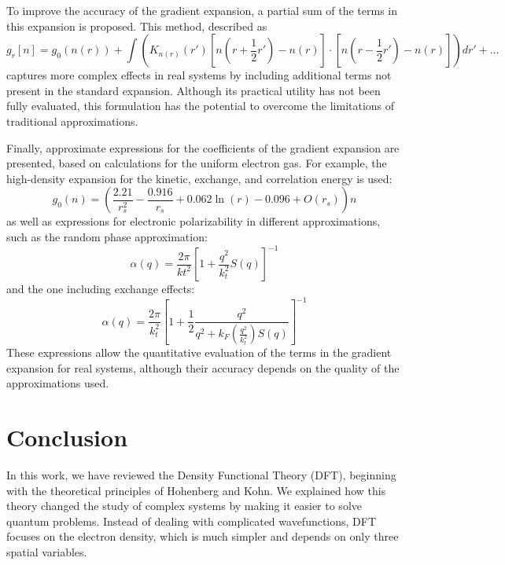 \documentclass[%
 preprint, linenumbers,
 amsmath,amssymb,
 aps, physrev,
]{revtex4-2}
\begin{document}
To improve the accuracy of the gradient expansion, a partial sum of the terms in this expansion is proposed. This method, described as
\begin{equation}
g_r[n] = g_0(n(r)) + \int \left( K_{n(r)}(r') \left[ n\left(r + \frac{1}{2} r'\right) - n(r) \right] \cdot \left[ n\left(r - \frac{1}{2} r'\right) - n(r) \right] \right) dr' + \ldots
\end{equation}
captures more complex effects in real systems by including additional terms not present in the standard expansion. Although its practical utility has not been fully evaluated, this formulation has the potential to overcome the limitations of traditional approximations.

Finally, approximate expressions for the coefficients of the gradient expansion are presented, based on calculations for the uniform electron gas. For example, the high-density expansion for the kinetic, exchange, and correlation energy is used:
\begin{equation}
g_0(n) = \left( \frac{2.21}{r_s^2} - \frac{0.916}{r_s} + 0.062 \ln(r) - 0.096 + O(r_s) \right) n
\end{equation}
as well as expressions for electronic polarizability in different approximations, such as the random phase approximation:
\begin{equation}
\alpha(q) = \frac{2\pi}{k t^2} \left[ 1 + \frac{q^2}{k_t^2} S(q) \right]^{-1}
\end{equation}
and the one including exchange effects:
\begin{equation}
\alpha(q) = \frac{2\pi}{k_t^2} \left[ 1 + \frac{1}{2} \frac{q^2}{q^2 + k_F \left( \frac{q^2}{k_t^2} \right) S(q)} \right]^{-1}
\end{equation}
These expressions allow the quantitative evaluation of the terms in the gradient expansion for real systems, although their accuracy depends on the quality of the approximations used.

\newpage
\section{Conclusion}
In this work, we have reviewed the Density Functional Theory (DFT), beginning with the theoretical principles of Hohenberg and Kohn. We explained how this theory changed the study of complex systems by making it easier to solve quantum problems. Instead of dealing with complicated wavefunctions, DFT focuses on the electron density, which is much simpler and depends on only three spatial variables.
\end{document}
